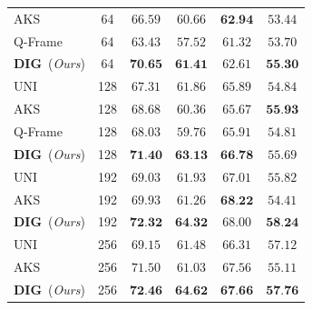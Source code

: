 \begin{table}[t]
\begin{minipage}{0.48\linewidth}
{\begin{tabular}{l|c|cccc}
        AKS~\cite{tang2025adaptivekeyframesamplinglong} & 64 & $66.59$ & $60.66$ & $\textbf{62.94}$ & $53.44$ \\
        Q-Frame~\cite{zhang2025qframequeryawareframeselection} & 64 & \cellcolor{red!10}$63.43$ & \cellcolor{red!10}$57.52$ & $61.32$ & $53.70$ \\
        \textbf{DIG}~(\textit{Ours}) & 64 & $\textbf{70.65}$ & $\textbf{61.41}$ & $62.61$ & $\textbf{55.30}$ \\
        \midrule
        UNI & 128 & $67.31$ & $61.86$ & $65.89$ & $54.84$ \\
        AKS~\cite{tang2025adaptivekeyframesamplinglong} & 128 & $68.68$ & \cellcolor{red!10}$60.36$ & \cellcolor{red!10}$65.67$ & $\textbf{55.93}$ \\
        Q-Frame~\cite{zhang2025qframequeryawareframeselection} & 128 & $68.03$ & \cellcolor{red!10}$59.76$ & $65.91$ & $54.81$ \\
        \textbf{DIG}~(\textit{Ours}) & 128 & $\textbf{71.40}$ & $\textbf{63.13}$ & $\textbf{66.78}$ & $55.69$ \\
        \midrule
        UNI & 192 & $69.03$ & $61.93$ & $67.01$ & $55.82$ \\
        AKS~\cite{tang2025adaptivekeyframesamplinglong} & 192 & $69.93$ & \cellcolor{red!10}$61.26$ & $\textbf{68.22}$ & \cellcolor{red!10}$54.41$ \\
        \textbf{DIG}~(\textit{Ours}) & 192 & $\textbf{72.32}$ & $\textbf{64.32}$ & $68.00$ & $\textbf{58.24}$ \\
        \midrule
        UNI & 256 & $69.15$ & $61.48$ & $66.31$ & $57.12$ \\
        AKS~\cite{tang2025adaptivekeyframesamplinglong} & 256 & $71.50$ & \cellcolor{red!10}$61.03$ & $67.56$ & \cellcolor{red!10}$55.11$ \\
        \textbf{DIG}~(\textit{Ours}) & 256 & $\textbf{72.46}$ & $\textbf{64.62}$ & $\textbf{67.66}$ & $\textbf{57.76}$ \\
        \bottomrule
      \end{tabular}
    }
  \end{minipage}
  \vspace{-6pt}
\end{table}

